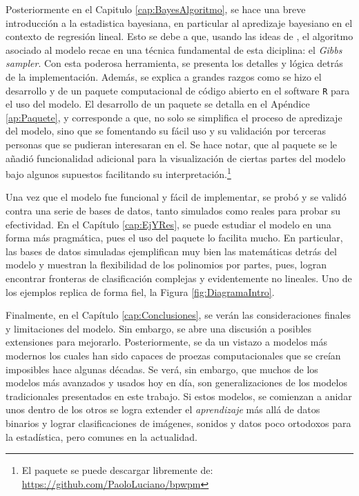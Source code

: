 \documentclass[../Main/Main.tex]{subfiles}
\begin{document}
Posteriormente en el Capitulo \ref{cap:BayesAlgoritmo}, se hace una breve introducción a la estadistica bayesiana, en particular al apredizaje bayesiano en el contexto de regresión lineal. Esto se debe a que, usando las ideas de \citet{albert1993bayesian}, el algoritmo asociado al modelo recae en una técnica fundamental de esta diciplina: el \textit{Gibbs sampler}. Con esta poderosa herramienta, se presenta los detalles y lógica detrás de la implementación. Además, se explica a grandes razgos como se hizo el desarrollo y de un paquete computacional de código abierto en el software \verb|R| para el uso del modelo. El desarrollo de un paquete se detalla en el Apéndice \ref{ap:Paquete}, y corresponde a que, no solo se simplifica el proceso de apredizaje del modelo, sino que se fomentando su fácil uso y su validación por terceras personas que se pudieran interesaran en el. Se hace notar, que al paquete se le añadió funcionalidad adicional para la visualización de ciertas partes del modelo bajo algunos supuestos facilitando su interpretación.\footnote{El paquete se puede descargar libremente de: \url{https://github.com/PaoloLuciano/bpwpm}}


Una vez que el modelo fue funcional y fácil de implementar, se probó y se validó contra una serie de bases de datos, tanto simulados como reales para probar su efectividad. En el Capítulo \ref{cap:EjYRes}, se puede estudiar el modelo en una forma más pragmática, pues el uso del paquete lo facilita mucho. En particular, las bases de datos simuladas ejemplifican muy bien las matemáticas detrás del modelo y muestran la flexibilidad de los polinomios por partes, pues, logran encontrar fronteras de clasificación complejas y evidentemente no lineales. Uno de los ejemplos replica de forma fiel, la Figura \ref{fig:DiagramaIntro}.

Finalmente, en el Capítulo \ref{cap:Conclusiones}, se verán las consideraciones finales y limitaciones del modelo. Sin embargo, se abre una discusión a posibles extensiones para mejorarlo. Posteriormente, se da un vistazo a modelos más modernos los cuales han sido capaces de proezas computacionales que se creían imposibles hace algunas décadas. Se verá, sin embargo, que muchos de los modelos más avanzados y usados hoy en día, son generalizaciones de los modelos tradicionales presentados en este trabajo. Si estos modelos, se comienzan a anidar unos dentro de los otros se logra extender el \textit{aprendizaje} más allá de datos binarios y lograr clasificaciones de imágenes, sonidos y datos poco ortodoxos para la estadística, pero comunes en la actualidad. 
\end{document}
